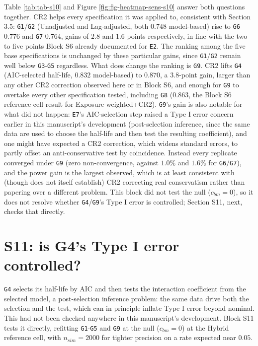 \documentclass[
  11pt,
]{article}
\begin{document}
Table \ref{tab:tab-s10} and Figure \ref{fig:fig-heatmap-sens-s10}
answer both questions together. CR2 helps every specification it was
applied to, consistent with Section 3.5: \texttt{G1}/\texttt{G2} (Unadjusted and
Lag-adjusted, both \(0.748\) model-based) rise to \texttt{G6} \(0.776\) and \texttt{G7}
\(0.764\), gains of \(2.8\) and \(1.6\) points respectively, in line with
the two to five points Block S6 already documented for \texttt{E2}. The
ranking among the five base specifications is unchanged by these
particular gains, since \texttt{G1}/\texttt{G2} remain well below \texttt{G3}-\texttt{G5}
regardless. What does change the ranking is \texttt{G9}. CR2 lifts \texttt{G4}
(AIC-selected half-life, \(0.832\) model-based) to \(0.870\), a \(3.8\)-point
gain, larger than any other CR2 correction observed here or in Block
S6, and enough for \texttt{G9} to overtake every other specification tested,
including \texttt{G8} (\(0.863\), the Block S6 reference-cell result for
Exposure-weighted+CR2). \texttt{G9}'s gain is also notable for what did not
happen: \texttt{E7}'s AIC-selection step raised a Type I error concern
earlier in this manuscript's development (post-selection inference,
since the same data are used to choose the half-life and then test
the resulting coefficient), and one might have expected a CR2
correction, which widens standard errors, to partly offset an
anti-conservative test by coincidence. Instead every replicate
converged under \texttt{G9} (zero non-convergence, against \(1.0\%\) and
\(1.6\%\) for \texttt{G6}/\texttt{G7}), and the power gain is the largest observed,
which is at least consistent with (though does not itself establish)
CR2 correcting real conservatism rather than papering over a
different problem. This block did not test the null (\(c_{bm} = 0\)),
so it does not resolve whether \texttt{G4}/\texttt{G9}'s Type I error is controlled;
Section S11, next, checks that directly.

\section{S11: is G4's Type I error controlled?}\label{s11-is-g4s-type-i-error-controlled}

\texttt{G4} selects its half-life by AIC and then tests the interaction
coefficient from the selected model, a post-selection inference
problem: the same data drive both the selection and the test, which
can in principle inflate Type I error beyond nominal. This had not
been checked anywhere in this manuscript's development. Block S11
tests it directly, refitting \texttt{G1}-\texttt{G5} and \texttt{G9} at the null
(\(c_{bm} = 0\)) at the Hybrid reference cell, with \(n_{sim} = 2000\)
for tighter precision on a rate expected near \(0.05\).
\end{document}
